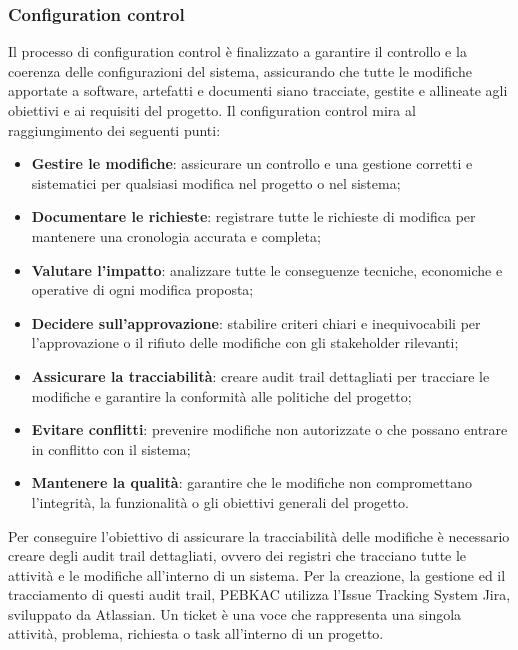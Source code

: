 \subsubsection{Configuration control}
Il processo di configuration control è finalizzato a garantire il controllo e la coerenza delle configurazioni del sistema, assicurando che tutte le modifiche apportate a software, artefatti e documenti siano tracciate, gestite e allineate agli obiettivi e ai requisiti del progetto.
Il configuration control mira al raggiungimento dei seguenti punti:
\begin{itemize}
    \item \textbf{Gestire le modifiche}: assicurare un controllo e una gestione corretti e sistematici per qualsiasi modifica nel progetto o nel sistema;
    \item \textbf{Documentare le richieste}: registrare tutte le richieste di modifica per mantenere una cronologia accurata e completa;
    \item \textbf{Valutare l'impatto}: analizzare tutte le conseguenze tecniche, economiche e operative di ogni modifica proposta;
    \item \textbf{Decidere sull'approvazione}: stabilire criteri chiari e inequivocabili per l'approvazione o il rifiuto delle modifiche con gli stakeholder rilevanti;
    \item \textbf{Assicurare la tracciabilità}: creare audit trail dettagliati per tracciare le modifiche e garantire la conformità alle politiche del progetto;
    \item \textbf{Evitare conflitti}: prevenire modifiche non autorizzate o che possano entrare in conflitto con il sistema;
    \item \textbf{Mantenere la qualità}: garantire che le modifiche non compromettano l'integrità, la funzionalità o gli obiettivi generali del progetto.
\end{itemize}
Per conseguire l'obiettivo di assicurare la tracciabilità delle modifiche è necessario creare degli audit trail dettagliati, ovvero dei registri che tracciano tutte le attività e le modifiche all'interno di un sistema. Per la creazione, la gestione ed il tracciamento di questi audit trail, PEBKAC utilizza l'Issue Tracking System Jira, sviluppato da Atlassian.
Un ticket è una voce che rappresenta una singola attività, problema, richiesta o task all'interno di un progetto. \\
